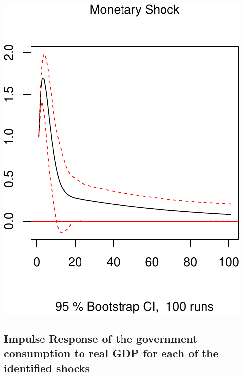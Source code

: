 \documentclass[11pt,preprint, authoryear]{elsarticle}
\numberwithin{equation}{section}
\numberwithin{figure}{section}
\numberwithin{table}{section}
\begin{document}
\includegraphics{TS_proj_files/figure-latex/unnamed-chunk-19-3.pdf}

\hypertarget{impulse-response-of-the-government-consumption-to-real-gdp-for-each-of-the-identified-shocks}{%
\subsection{Impulse Response of the government consumption to real GDP
for each of the identified
shocks}\label{impulse-response-of-the-government-consumption-to-real-gdp-for-each-of-the-identified-shocks}}
\end{document}
